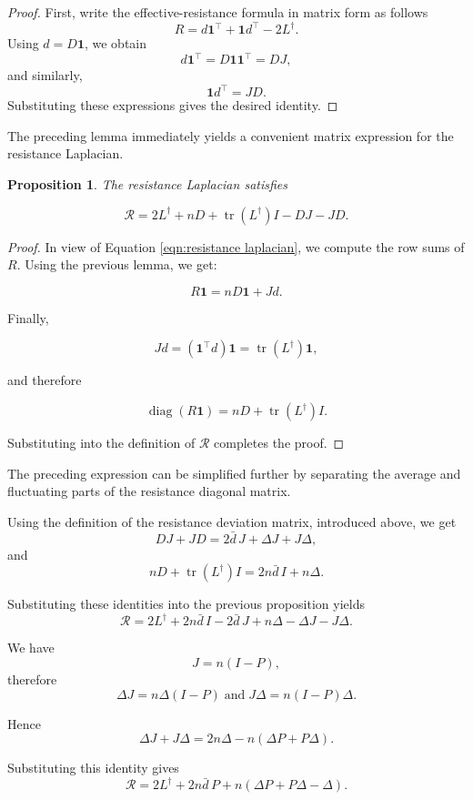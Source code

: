 \documentclass[12pt,a4paper]{amsart}
\newtheorem{proposition}[theorem]{Proposition}
\theoremstyle{remark}
\theoremstyle{definition}
\newcommand{\1}{\mathbf{1}}
\newcommand{\0}{\mathbf{0}}
\begin{document}
\begin{proof}
First, write the effective-resistance formula in matrix form as follows
\[
R=d\mathbf{1}^\top+\mathbf{1}d^\top-2L^\dagger.
\]
Using $d=D\mathbf{1}$, we obtain
\[
d\mathbf{1}^\top=D\mathbf{1}\mathbf{1}^\top=DJ,
\]
and similarly,
\[
\mathbf{1}d^\top=JD.
\]
Substituting these expressions gives the desired identity.
\end{proof}


The preceding lemma immediately yields a convenient matrix expression for
the resistance Laplacian.

\begin{proposition}
The resistance Laplacian satisfies

\[ \mathcal{R} = 2L^\dagger + nD + \operatorname{tr}(L^\dagger)I - DJ -JD.
\]
\end{proposition}

\begin{proof}
In view of Equation \ref{eqn:resistance laplacian}, we compute the row sums of $R$.
Using the previous lemma, we get:

\[
R\mathbf{1}
=
nD\mathbf{1}
+
Jd.
\]

Finally,

\[
Jd
=
(\mathbf{1}^\top d)\mathbf{1}
=
\operatorname{tr}(L^\dagger)\mathbf{1},
\]

and therefore

\[
\operatorname{diag}(R\mathbf{1})
=
nD+\operatorname{tr}(L^\dagger)I.
\]

Substituting into the definition of $\mathcal{R}$ completes the proof.
\end{proof}


The preceding expression can be simplified further by separating the
average and fluctuating parts of the resistance diagonal matrix.

Using the definition of the resistance deviation matrix, introduced above, we get
\[
DJ+JD = 2\bar d\,J+\Delta J+J\Delta,
\]
and
\[
nD+\operatorname{tr}(L^\dagger)I = 2n\bar d\,I+n\Delta.
\]

Substituting these identities into the previous proposition yields
\[
\mathcal{R} = 2L^\dagger + 2n\bar d\,I - 2\bar d\,J + n\Delta - \Delta J - J\Delta. 
\]


We have
\[
J=n(I-P),
\]
therefore
\[
\Delta J=n\Delta(I-P) \;\text{and}\; J\Delta=n(I-P)\Delta.
\]

Hence
\[
\Delta J+J\Delta
=
2n\Delta
-
n(\Delta P+P\Delta).
\]

Substituting this identity gives
\[
\mathcal{R} = 2L^\dagger + 2n\bar d\,P + n(\Delta P+P\Delta-\Delta).
\]
\end{document}
